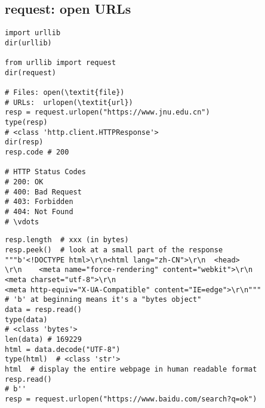\documentclass{beamer}
\begin{document}
\subsection{request: open URLs}

\begin{frame}[fragile]{}
\begin{verbatim}
import urllib
dir(urllib)

from urllib import request
dir(request)

# Files: open(\textit{file})
# URLs:  urlopen(\textit{url})
resp = request.urlopen("https://www.jnu.edu.cn")
type(resp)
# <class 'http.client.HTTPResponse'>
dir(resp)
resp.code # 200

# HTTP Status Codes
# 200: OK
# 400: Bad Request
# 403: Forbidden
# 404: Not Found
# \vdots
\end{verbatim}
\end{frame}

\begin{frame}[fragile]{}
\begin{verbatim}
resp.length  # xxx (in bytes)
resp.peek()  # look at a small part of the response
"""b'<!DOCTYPE html>\r\n<html lang="zh-CN">\r\n  <head>
\r\n    <meta name="force-rendering" content="webkit">\r\n
<meta charset="utf-8">\r\n    
<meta http-equiv="X-UA-Compatible" content="IE=edge">\r\n"""
# 'b' at beginning means it's a "bytes object"
data = resp.read()
type(data)
# <class 'bytes'>
len(data) # 169229
html = data.decode("UTF-8")
type(html)  # <class 'str'>
html  # display the entire webpage in human readable format
resp.read()
# b''
resp = request.urlopen("https://www.baidu.com/search?q=ok")
\end{verbatim}
\end{frame}
\end{document}
